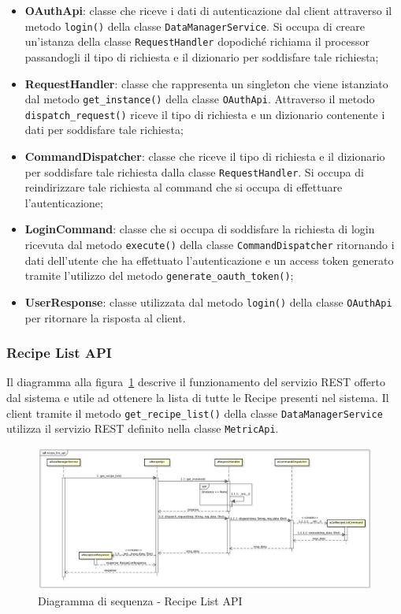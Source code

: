     \begin{itemize}
        \item \textbf{OAuthApi}: classe che riceve i dati di autenticazione dal client attraverso il metodo \texttt{login()} della classe \texttt{DataManagerService}. Si occupa di creare un'istanza della classe \texttt{RequestHandler} dopodiché richiama il processor passandogli il tipo di richiesta e il dizionario per soddisfare tale richiesta;
        \item \textbf{RequestHandler}: classe che rappresenta un singleton che viene istanziato dal metodo \texttt{get\_instance()} della classe \texttt{OAuthApi}. Attraverso il metodo \texttt{dispatch\_request()} riceve il tipo di richiesta e un dizionario contenente i dati per soddisfare tale richiesta;
        \item \textbf{CommandDispatcher}: classe che riceve il tipo di richiesta e il dizionario per soddisfare tale richiesta dalla classe \texttt{RequestHandler}. Si occupa di reindirizzare tale richiesta al command che si occupa di effettuare l'autenticazione;
        \item \textbf{LoginCommand}: classe che si occupa di soddisfare la richiesta di login ricevuta dal metodo \texttt{execute()} della classe \texttt{CommandDispatcher} ritornando i dati dell'utente che ha effettuato l'autenticazione e un access token generato tramite l'utilizzo del metodo \texttt{generate\_oauth\_token()};
        \item \textbf{UserResponse}: classe utilizzata dal metodo \texttt{login()} della classe \texttt{OAuthApi} per ritornare la risposta al client.
    \end{itemize}


	\subsubsection{Recipe List API} %
    \label{ssub:recipe_list_api}
    Il diagramma alla figura~\ref{fig:recipe_list} descrive il funzionamento del servizio REST offerto dal sistema e utile ad ottenere la lista di tutte le Recipe presenti nel sistema. Il client tramite il metodo \texttt{get\_recipe\_list()} della classe \texttt{DataManagerService} utilizza il servizio REST definito nella classe \texttt{MetricApi}. \newline

    \begin{figure}[!htbp]
		\centering
			\centerline{\includegraphics[angle=90, scale=0.4]{./images/sequence_diagram/recipe_list_api.pdf}}
		\caption{Diagramma di sequenza - Recipe List API}
        \label{fig:recipe_list}
	\end{figure}


